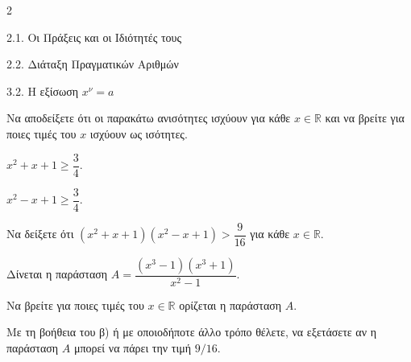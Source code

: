 \begin{ylh}{2}
    \item 2.1. Οι Πράξεις και οι Ιδιότητές τους
    \item 2.2. Διάταξη Πραγματικών Αριθμών
    \item 3.2. Η εξίσωση $x^{\nu}=a$
\end{ylh}

\begin{alist}
\item Να αποδείξετε ότι οι παρακάτω ανισότητες ισχύουν για κάθε $x \in \mathbb{R}$ και να βρείτε για ποιες τιμές του $x$ ισχύουν ως ισότητες.

\begin{rlist}
\item $x^2 + x + 1 \ge \dfrac{3}{4}$. 
\item $x^2 - x + 1 \ge \dfrac{3}{4}$. 
\end{rlist}
\item Να δείξετε ότι $(x^2 + x + 1)(x^2 - x + 1) > \dfrac{9}{16}$ για κάθε $x \in \mathbb{R}$. 
\item Δίνεται η παράσταση $A = \dfrac{(x^3 - 1)(x^3 + 1)}{x^2 - 1}$.

\begin{rlist}
\item Να βρείτε για ποιες τιμές του $x \in \mathbb{R}$ ορίζεται η παράσταση $A$. 
\item Με τη βοήθεια του β) ή με οποιοδήποτε άλλο τρόπο θέλετε, να εξετάσετε αν η παράσταση $A$ μπορεί να πάρει την τιμή $9/16$.
\end{rlist}
\end{alist}


